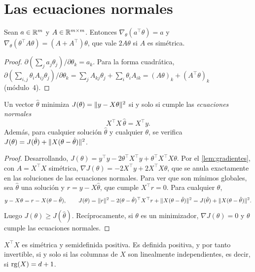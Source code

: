 \section{Las ecuaciones normales}

\begin{lema}\label{lem:gradientes}
Sean $a\in\mathbb{R}^{m}$ y $A\in\mathbb{R}^{m\times m}$. Entonces $\nabla_\theta(a^{\top}\theta)=a$ y $\nabla_\theta(\theta^{\top}A\theta)=(A+A^{\top})\theta$, que vale $2A\theta$ si $A$ es simétrica.
\end{lema}

\begin{proof}
$\partial(\sum_j a_j\theta_j)/\partial\theta_k=a_k$. Para la forma cuadrática, $\partial(\sum_{i,j}\theta_iA_{ij}\theta_j)/\partial\theta_k=\sum_j A_{kj}\theta_j+\sum_i\theta_iA_{ik}=(A\theta)_k+(A^{\top}\theta)_k$ (módulo~4).
\end{proof}

\begin{teorema}\label{teo:normales}
Un vector $\hat\theta$ minimiza $J(\theta)=\lVert y-X\theta\rVert^{2}$ si y solo si cumple las \emph{ecuaciones normales}
\[
X^{\top}X\,\hat\theta=X^{\top}y.
\]
Además, para cualquier solución $\hat\theta$ y cualquier $\theta$, se verifica $J(\theta)=J(\hat\theta)+\lVert X(\theta-\hat\theta)\rVert^{2}$.
\end{teorema}

\begin{proof}
Desarrollando, $J(\theta)=y^{\top}y-2\theta^{\top}X^{\top}y+\theta^{\top}X^{\top}X\theta$. Por el \cref{lem:gradientes}, con $A=X^{\top}X$ simétrica, $\nabla J(\theta)=-2X^{\top}y+2X^{\top}X\theta$, que se anula exactamente en las soluciones de las ecuaciones normales. Para ver que son mínimos globales, sea $\hat\theta$ una solución y $r=y-X\hat\theta$, que cumple $X^{\top}r=0$. Para cualquier $\theta$,
\[
y-X\theta=r-X(\theta-\hat\theta),\qquad
J(\theta)=\lVert r\rVert^{2}-2(\theta-\hat\theta)^{\top}X^{\top}r+\lVert X(\theta-\hat\theta)\rVert^{2}=J(\hat\theta)+\lVert X(\theta-\hat\theta)\rVert^{2}.
\]
Luego $J(\theta)\ge J(\hat\theta)$. Recíprocamente, si $\theta$ es un minimizador, $\nabla J(\theta)=0$ y $\theta$ cumple las ecuaciones normales.
\end{proof}

\begin{lema}\label{lem:rango}
$X^{\top}X$ es simétrica y semidefinida positiva. Es definida positiva, y por tanto invertible, si y solo si las columnas de $X$ son linealmente independientes, es decir, si $\operatorname{rg}(X)=d+1$.
\end{lema}

